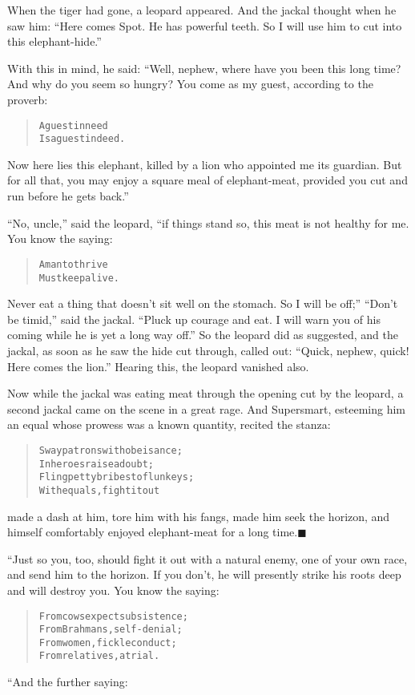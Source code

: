 \documentclass[article, twoside, 14pt]{memoir}
\newcommand{\qed}{\hfill \ensuremath{\blacksquare}}
\renewenvironment{verbatim}{%
\begin{quote}%
\vskip -10pt%
\begin{alltt}\normalfont\large}{\end{alltt}%
\end{quote}%
\vskip -10pt
} %
\begin{document}
When the tiger had gone, a leopard appeared. And the jackal thought
when he saw him:
``Here comes Spot. He has powerful teeth. So I will use him to cut into this elephant-hide.''

With this in mind, he said: “Well, nephew, where have you been this
long time? And why do you seem so hungry? You come as my guest,
according to the proverb:

\begin{verbatim}
A guest in need
Is a guest indeed.
\end{verbatim}
Now here lies this elephant, killed by a lion who appointed me its
guardian. But for all that, you may enjoy a square meal of
elephant-meat, provided you cut and run before he gets back.”

``No, uncle,'' said the leopard, “if things stand so, this meat is
not healthy for me. You know the saying:

\begin{verbatim}
A man to thrive
Must keep alive.
\end{verbatim}
Never eat a thing that doesn't sit well on the stomach. So I will
be off;” ``Don't be timid,'' said the jackal.
``Pluck up courage and eat. I will warn you of his coming while he is yet a long way off.''
So the leopard did as suggested, and the jackal, as soon as he saw
the hide cut through, called out:
``Quick, nephew, quick! Here comes the lion.'' Hearing this, the
leopard vanished also.

Now while the jackal was eating meat through the opening cut by the
leopard, a second jackal came on the scene in a great rage. And
Supersmart, esteeming him an equal whose prowess was a known
quantity, recited the stanza:

\begin{verbatim}
Sway patrons with obeisance;
    In heroes raise a doubt;
Fling petty bribes to flunkeys;
    With equals, fight it out{\textemdash}
\end{verbatim}
made a dash at him, tore him with his fangs, made him seek
the horizon, and himself comfortably enjoyed elephant-meat for a
long time.\hyperref[s76]{\qed}

“Just so you, too, should fight it out with a natural enemy, one of
your own race, and send him to the horizon. If you don't, he will
presently strike his roots deep and will destroy you. You know the
saying:

\begin{verbatim}
From cows expect subsistence;
    From Brahmans, self-denial;
From women, fickle conduct;
    From relatives, a trial.
\end{verbatim}
“And the further saying:
\end{document}
